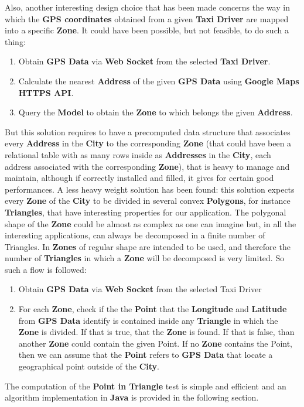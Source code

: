 Also, another interesting design choice that has been made concerns the way in which the \textbf{GPS coordinates} obtained from a given \textbf{Taxi Driver} are mapped into a specific \textbf{Zone}.
It could have been possible, but not feasible, to do such a thing:
\begin{enumerate}
	\item Obtain \textbf{GPS Data} via \textbf{Web Socket} from the selected \textbf{Taxi Driver}.
	\item Calculate the nearest \textbf{Address} of the given \textbf{GPS Data} using \textbf{Google Maps HTTPS API}.
	\item Query the \textbf{Model} to obtain the \textbf{Zone} to which belongs the given \textbf{Address}.
\end{enumerate}
But this solution requires to have a precomputed data structure that associates every \textbf{Address} in the \textbf{City} to the corresponding \textbf{Zone} (that could have been a relational table with as many rows inside as \textbf{Addresses} in the \textbf{City}, each address associated with the corresponding \textbf{Zone}), that is heavy to manage and maintain, although if correctly installed and filled, it gives for certain good performances.
A less heavy weight solution has been found: this solution expects every \textbf{Zone} of the \textbf{City} to be divided in several convex \textbf{Polygons}, for instance \textbf{Triangles}, that have interesting properties for our application.
The polygonal shape of the \textbf{Zone} could be almost as complex as one can imagine but, in all the interesting applications, can always be decomposed in a finite number of Triangles.
In \myTaxiService{} \textbf{Zones} of regular shape are intended to be used, and therefore the number of \textbf{Triangles} in which a \textbf{Zone} will be decomposed is very limited.
So such a flow is followed:
\begin{enumerate}
	\item Obtain \textbf{GPS Data} via \textbf{Web Socket} from the selected Taxi Driver
	\item For each \textbf{Zone}, check if the the \textbf{Point} that the \textbf{Longitude} and \textbf{Latitude} from \textbf{GPS Data} identify is contained inside any \textbf{Triangle} in which the \textbf{Zone} is divided. If that is true, that the \textbf{Zone} is found. If that is false, than another \textbf{Zone} could contain the given Point. If no \textbf{Zone} contains the Point, then we can assume that the \textbf{Point} refers to \textbf{GPS Data} that locate a geographical point outside of the \textbf{City}.
\end{enumerate}
The computation of the \textbf{Point in Triangle} test is simple and efficient and an algorithm implementation in \textbf{Java} is provided in the following section.
